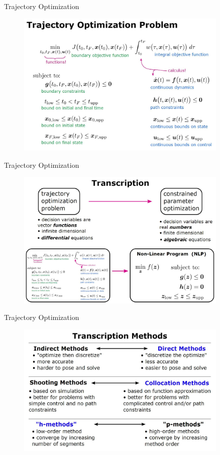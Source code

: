 \documentclass{thesisbeamer}
\begin{document}
\begin{frame}[t]{Trajectory Optimization}
\begin{figure}
\centering
\includegraphics[width=0.9\textwidth]{Images/Trajectory optimization/5}
\end{figure}
\end{frame}

\begin{frame}[t]{Trajectory Optimization}
\begin{figure}
\centering
\includegraphics[width=0.9\textwidth]{Images/Trajectory optimization/6}
\end{figure}
\end{frame}

\begin{frame}[t]{Trajectory Optimization}
\begin{figure}
\centering
\includegraphics[width=0.9\textwidth]{Images/Trajectory optimization/7}
\end{figure}
\end{frame}
\end{document}
